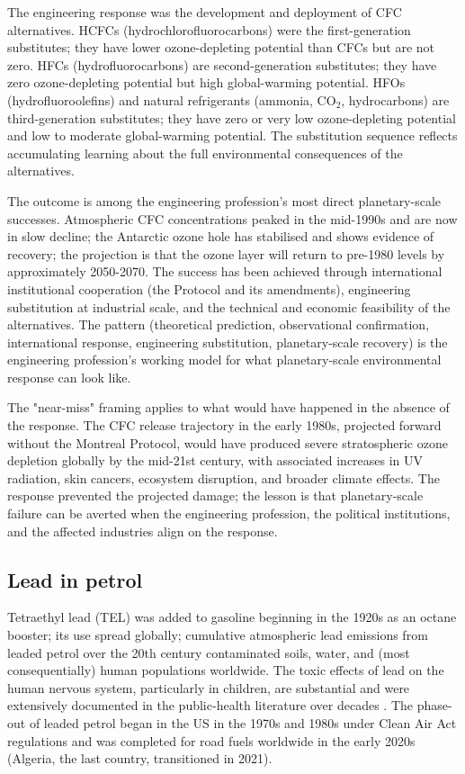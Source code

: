 The engineering response was the development and deployment of CFC alternatives. HCFCs (hydrochlorofluorocarbons) were the first-generation substitutes; they have lower ozone-depleting potential than CFCs but are not zero. HFCs (hydrofluorocarbons) are second-generation substitutes; they have zero ozone-depleting potential but high global-warming potential. HFOs (hydrofluoroolefins) and natural refrigerants (ammonia, CO$_2$, hydrocarbons) are third-generation substitutes; they have zero or very low ozone-depleting potential and low to moderate global-warming potential. The substitution sequence reflects accumulating learning about the full environmental consequences of the alternatives.

The outcome is among the engineering profession's most direct planetary-scale successes. Atmospheric CFC concentrations peaked in the mid-1990s and are now in slow decline; the Antarctic ozone hole has stabilised and shows evidence of recovery; the projection is that the ozone layer will return to pre-1980 levels by approximately 2050-2070. The success has been achieved through international institutional cooperation (the Protocol and its amendments), engineering substitution at industrial scale, and the technical and economic feasibility of the alternatives. The pattern (theoretical prediction, observational confirmation, international response, engineering substitution, planetary-scale recovery) is the engineering profession's working model for what planetary-scale environmental response can look like.

The "near-miss" framing applies to what would have happened in the absence of the response. The CFC release trajectory in the early 1980s, projected forward without the Montreal Protocol, would have produced severe stratospheric ozone depletion globally by the mid-21st century, with associated increases in UV radiation, skin cancers, ecosystem disruption, and broader climate effects. The response prevented the projected damage; the lesson is that planetary-scale failure can be averted when the engineering profession, the political institutions, and the affected industries align on the response.

\subsection*{Lead in petrol}

Tetraethyl lead (TEL) was added to gasoline beginning in the 1920s as an octane booster; its use spread globally; cumulative atmospheric lead emissions from leaded petrol over the 20th century contaminated soils, water, and (most consequentially) human populations worldwide. The toxic effects of lead on the human nervous system, particularly in children, are substantial and were extensively documented in the public-health literature over decades \cite{paper:needleman-lead-1990}. The phase-out of leaded petrol began in the US in the 1970s and 1980s under Clean Air Act regulations and was completed for road fuels worldwide in the early 2020s (Algeria, the last country, transitioned in 2021).

